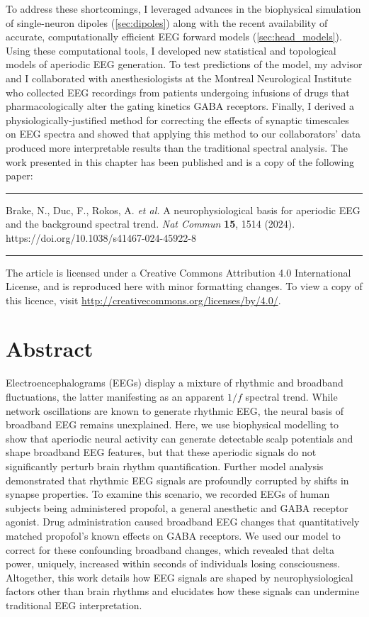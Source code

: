 To address these shortcomings, I leveraged advances in the biophysical simulation of single-neuron dipoles (\autoref{sec:dipoles}) along with the recent availability of accurate, computationally efficient EEG forward models (\autoref{sec:head_models}). Using these computational tools, I developed new statistical and topological models of aperiodic EEG generation. To test predictions of the model, my advisor and I collaborated with anesthesiologists at the Montreal Neurological Institute who collected EEG recordings from patients undergoing infusions of drugs that pharmacologically alter the gating kinetics GABA receptors. Finally, I derived a physiologically-justified method for correcting the effects of synaptic timescales on EEG spectra and showed that applying this method to our collaborators' data produced more interpretable results than the traditional spectral analysis. The work presented in this chapter has been published and is a copy of the following paper:

\vspace{1em}
\hrule
\vspace{.5em}
\noindent
\hangindent=1cm
Brake, N., Duc, F., Rokos, A. \textit{et al.} A neurophysiological basis for aperiodic EEG and the background spectral trend. \textit{Nat Commun} \textbf{15}, 1514 (2024). https://doi.org/10.1038/s41467-024-45922-8
\vspace{.75em}
\hrule
\vspace{.65em}

\noindent
The article is licensed under a Creative Commons Attribution 4.0 International License, and is reproduced here with minor formatting changes. To view a copy of this licence, visit \url{http://creativecommons.org/licenses/by/4.0/}.


\newpage

\section{Abstract}
Electroencephalograms (EEGs) display a mixture of rhythmic and broadband fluctuations, the latter manifesting as an apparent $1/f$ spectral trend. While network oscillations are known to generate rhythmic EEG, the neural basis of broadband EEG remains unexplained. Here, we use biophysical modelling to show that aperiodic neural activity can generate detectable scalp potentials and shape broadband EEG features, but that these aperiodic signals do not significantly perturb brain rhythm quantification. Further model analysis demonstrated that rhythmic EEG signals are profoundly corrupted by shifts in synapse properties. To examine this scenario, we recorded EEGs of human subjects being administered propofol, a general anesthetic and GABA receptor agonist. Drug administration caused broadband EEG changes that quantitatively matched propofol’s known effects on GABA receptors. We used our model to correct for these confounding broadband changes, which revealed that delta power, uniquely, increased within seconds of individuals losing consciousness. Altogether, this work details how EEG signals are shaped by neurophysiological factors other than brain rhythms and elucidates how these signals can undermine traditional EEG interpretation.


